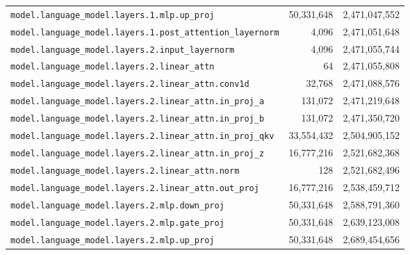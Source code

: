 \documentclass[10pt,a4paper]{article}
\theoremstyle{definition}
\begin{document}
\begin{appendices}
\begin{longtable}{p{9.5cm}rr}
\texttt{model.\allowbreak{}language\_model.\allowbreak{}layers.\allowbreak{}1.\allowbreak{}mlp.\allowbreak{}up\_proj} & 50,331,648 & 2,471,047,552 \\
\texttt{model.\allowbreak{}language\_model.\allowbreak{}layers.\allowbreak{}1.\allowbreak{}post\_attention\_layernorm} & 4,096 & 2,471,051,648 \\
\texttt{model.\allowbreak{}language\_model.\allowbreak{}layers.\allowbreak{}2.\allowbreak{}input\_layernorm} & 4,096 & 2,471,055,744 \\
\texttt{model.\allowbreak{}language\_model.\allowbreak{}layers.\allowbreak{}2.\allowbreak{}linear\_attn} & 64 & 2,471,055,808 \\
\texttt{model.\allowbreak{}language\_model.\allowbreak{}layers.\allowbreak{}2.\allowbreak{}linear\_attn.\allowbreak{}conv1d} & 32,768 & 2,471,088,576 \\
\texttt{model.\allowbreak{}language\_model.\allowbreak{}layers.\allowbreak{}2.\allowbreak{}linear\_attn.\allowbreak{}in\_proj\_a} & 131,072 & 2,471,219,648 \\
\texttt{model.\allowbreak{}language\_model.\allowbreak{}layers.\allowbreak{}2.\allowbreak{}linear\_attn.\allowbreak{}in\_proj\_b} & 131,072 & 2,471,350,720 \\
\texttt{model.\allowbreak{}language\_model.\allowbreak{}layers.\allowbreak{}2.\allowbreak{}linear\_attn.\allowbreak{}in\_proj\_qkv} & 33,554,432 & 2,504,905,152 \\
\texttt{model.\allowbreak{}language\_model.\allowbreak{}layers.\allowbreak{}2.\allowbreak{}linear\_attn.\allowbreak{}in\_proj\_z} & 16,777,216 & 2,521,682,368 \\
\texttt{model.\allowbreak{}language\_model.\allowbreak{}layers.\allowbreak{}2.\allowbreak{}linear\_attn.\allowbreak{}norm} & 128 & 2,521,682,496 \\
\texttt{model.\allowbreak{}language\_model.\allowbreak{}layers.\allowbreak{}2.\allowbreak{}linear\_attn.\allowbreak{}out\_proj} & 16,777,216 & 2,538,459,712 \\
\texttt{model.\allowbreak{}language\_model.\allowbreak{}layers.\allowbreak{}2.\allowbreak{}mlp.\allowbreak{}down\_proj} & 50,331,648 & 2,588,791,360 \\
\texttt{model.\allowbreak{}language\_model.\allowbreak{}layers.\allowbreak{}2.\allowbreak{}mlp.\allowbreak{}gate\_proj} & 50,331,648 & 2,639,123,008 \\
\texttt{model.\allowbreak{}language\_model.\allowbreak{}layers.\allowbreak{}2.\allowbreak{}mlp.\allowbreak{}up\_proj} & 50,331,648 & 2,689,454,656 \\

\end{longtable}
\end{appendices}
\end{document}
